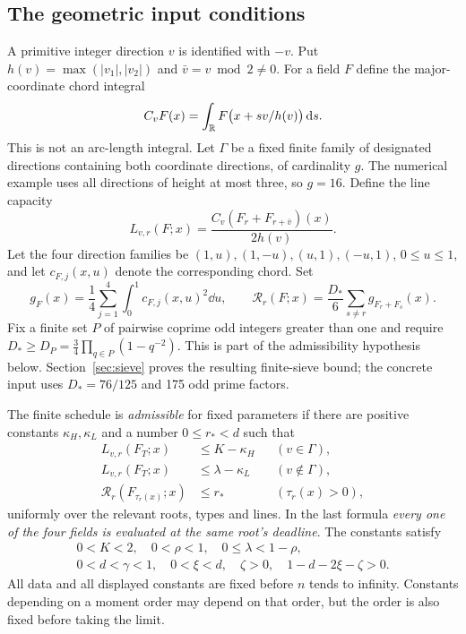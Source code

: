 \subsection{The geometric input conditions}
A primitive integer direction \(v\) is identified with \(-v\). Put
\(h(v)=\max(|v_1|,|v_2|)\) and \(\bar v=v\bmod2\ne0\).
For a field \(F\) define the major-coordinate chord integral
\[
 C_vF(x)=\int_{\mathbb R}F\bigl(x+s v/h(v)\bigr)\,\mathrm d s.
\]
This is not an arc-length integral. Let \(\Gamma\) be a fixed finite
family of designated directions containing both coordinate directions,
of cardinality \(g\).
The numerical example uses all directions of height at most three,
so \(g=16\). Define the line capacity
\begin{equation}\label{eq:capacity}
 L_{v,r}(F;x)=\frac{C_v(F_r+F_{r+\bar v})(x)}{2h(v)}.
\end{equation}
Let the four direction families be
\((1,u),(1,-u),(u,1),(-u,1)\), \(0\le u\le1\), and let
\(c_{F,j}(x,u)\) denote the corresponding chord. Set
\begin{equation}\label{eq:risk}
 g_F(x)=\frac14\sum_{j=1}^4\int_0^1c_{F,j}(x,u)^2\dd u,
 \qquad
 \mathcal R_r(F;x)=\frac{D_*}{6}\sum_{s\ne r}g_{F_r+F_s}(x).
\end{equation}
Fix a finite set \(P\) of pairwise coprime odd integers greater than one
and require \(D_*\ge D_P=\tfrac34\prod_{q\in P}(1-q^{-2})\).
This is part of the admissibility hypothesis below.
Section~\ref{sec:sieve} proves the resulting finite-sieve bound;
the concrete input uses \(D_*=76/125\) and 175 odd prime factors.

The finite schedule is \emph{admissible} for fixed parameters if there
are positive constants \(\kappa_H,\kappa_L\) and a number \(0\le r_*<d\)
such that
\begin{align}
 L_{v,r}(F_T;x)&\le K-\kappa_H &&(v\in\Gamma),\label{eq:heavyinput}\\
 L_{v,r}(F_T;x)&\le\lambda-\kappa_L &&(v\notin\Gamma),\label{eq:lightinput}\\
 \mathcal R_r(F_{\tau_r(x)};x)&\le r_* &&(\tau_r(x)>0),\label{eq:riskinput}
\end{align}
uniformly over the relevant roots, types and lines. In the last formula
\emph{every one of the four fields is evaluated at the same root's
deadline}. The constants satisfy
\begin{equation}\label{eq:exponents}
 \begin{gathered}
 0<K<2,\quad 0<\rho<1,\quad 0\le\lambda<1-\rho,\\
 0<d<\gamma<1,\quad 0<\xi<d,\quad \zeta>0,\quad 1-d-2\xi-\zeta>0.
 \end{gathered}
\end{equation}
All data and all displayed constants are fixed before \(n\) tends to
infinity. Constants depending on a moment order may depend on that
order, but the order is also fixed before taking the limit.

